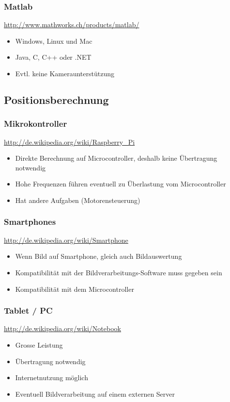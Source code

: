 \subsubsection{Matlab}
\url{http://www.mathworks.ch/products/matlab/}
\begin{itemize}
    \item Windows, Linux und Mac
    \item Java, C, C++ oder .NET
    \item Evtl. keine Kameraunterstützung
\end{itemize}

\subsection{Positionsberechnung}

\subsubsection{Mikrokontroller}
\url{http://de.wikipedia.org/wiki/Raspberry_Pi}
\begin{itemize}
    \item Direkte Berechnung auf Microcontroller, deshalb keine Übertragung notwendig
    \item Hohe Frequenzen führen eventuell zu Überlastung vom Microcontroller
    \item Hat andere Aufgaben (Motorensteuerung)
\end{itemize}

\subsubsection{Smartphones}
\url{http://de.wikipedia.org/wiki/Smartphone}
\begin{itemize}
    \item Wenn Bild auf Smartphone, gleich auch Bildauswertung
    \item Kompatibilität mit der Bildverarbeitungs-Software muss gegeben sein
    \item Kompatibilität mit dem Microcontroller
\end{itemize}

\subsubsection{Tablet / PC}
\url{http://de.wikipedia.org/wiki/Notebook}
\begin{itemize}
    \item Grosse Leistung
    \item Übertragung notwendig
    \item Internetnutzung möglich
    \item Eventuell Bildverarbeitung auf einem externen Server
\end{itemize}

